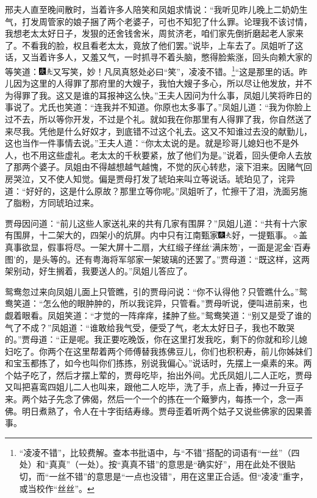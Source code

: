 邢夫人直至晚间散时，当着许多人陪笑和凤姐求情说：“我听见昨儿晚上二奶奶生气，打发周管家的娘子捆了两个老婆子，可也不知犯了什么罪。论理我不该讨情，我想老太太好日子，发狠的还舍钱舍米，周贫济老，咱们家先倒折磨起老人家来了。不看我的脸，权且看老太太，竟放了他们罢。”说毕，上车去了。凤姐听了这话，又当着许多人，又羞又气，一时抓寻不着头脑，憋得脸紫涨，回头向赖大家的等笑道：{\includegraphics[width=3mm]{../Images/00004}\includegraphics[width=3mm]{../Images/00012}\footnotesize \kaishu 又写笑，妙！凡凤真怒处必曰“笑”，凌凌不错。}\footnote{“凌凌不错”，比较费解。查本书批语中，与“不错”搭配的词语有“一丝”（四处）和“真真”（一处）。按“真真不错”的意思是“确实好”，用在此处不很贴切，而“一丝不错”的意思是“一点也没错”，用在这里正合适。但“凌凌”重字，或当校作“丝丝”。}“这是那里的话。昨儿因为这里的人得罪了那府里的大嫂子，我怕大嫂子多心，所以尽让他发放，并不为得罪了我。这又是谁的耳报神这么快。”王夫人因问为什么事，凤姐儿笑将昨日的事说了。尤氏也笑道：“连我并不知道。你原也太多事了。”凤姐儿道：“我为你脸上过不去，所以等你开发，不过是个礼。就如我在你那里有人得罪了我，你自然送了来尽我。凭他是什么好奴才，到底错不过这个礼去。这又不知谁过去没的献勤儿，这也当作一件事情去说。”王夫人道：“你太太说的是。就是珍哥儿媳妇也不是外人，也不用这些虚礼。老太太的千秋要紧，放了他们为是。”说着，回头便命人去放了那两个婆子。凤姐由不得越想越气越愧，不觉的灰心转悲，滚下泪来。因赌气回房哭泣，又不使人知觉。偏是贾母打发了琥珀来叫立等说话。琥珀见了，诧异道：“好好的，这是什么原故？那里立等你呢。”凤姐听了，忙擦干了泪，洗面另施了脂粉，方同琥珀过来。

贾母因问道：“前儿这些人家送礼来的共有几家有围屏？”凤姐儿道：“共有十六家有围屏，十二架大的，四架小的炕屏。内中只有江南甄家{\includegraphics[width=3mm]{../Images/00004}\includegraphics[width=3mm]{../Images/00012}\footnotesize \kaishu 好，一提甄事。{$\diamond$}盖真事欲显，假事将尽。}一架大屏十二扇，大红缎子缂丝‘满床笏’，一面是泥金‘百寿图’的，是头等的。还有粤海将军邬家一架玻璃的还罢了。”贾母道：“既这样，这两架别动，好生搁着，我要送人的。”凤姐儿答应了。

鸳鸯忽过来向凤姐儿面上只管瞧，引的贾母问说：“你不认得他？只管瞧什么。”鸳鸯笑道：“怎么他的眼肿肿的，所以我诧异，只管看。”贾母听说，便叫进前来，也觑着眼看。凤姐笑道：“才觉的一阵痒痒，揉肿了些。”鸳鸯笑道：“别又是受了谁的气了不成？”凤姐道：“谁敢给我气受，便受了气，老太太好日子，我也不敢哭的。”贾母道：“正是呢。我正要吃晚饭，你在这里打发我吃，剩下的你就和珍儿媳妇吃了。你两个在这里帮着两个师傅替我拣佛豆儿，你们也积积寿，前儿你姊妹们和宝玉都拣了，如今也叫你们拣拣，别说我偏心。”说话时，先摆上一桌素的来。两个姑子吃了，然后才摆上荤的，贾母吃毕，抬出外间。尤氏凤姐儿二人正吃，贾母又叫把喜鸾四姐儿二人也叫来，跟他二人吃毕，洗了手，点上香，捧过一升豆子来。两个姑子先念了佛偈，然后一个一个的拣在一个簸箩内，每拣一个，念一声佛。明日煮熟了，令人在十字街结寿缘。贾母歪着听两个姑子又说些佛家的因果善事。

